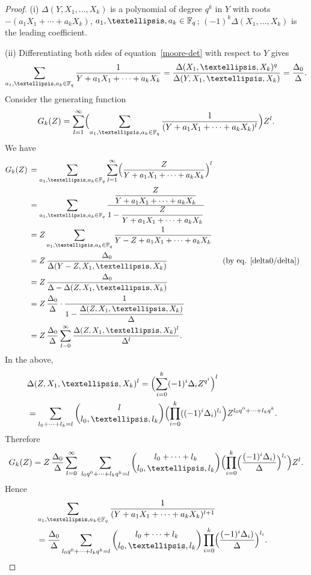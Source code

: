 \documentclass[10pt,a4paper]{amsart}
\begin{document}
\begin{proof} 
(i) $\Delta(Y,X_1,\dots,X_k)$ is a polynomial of degree $q^k$ in $Y$ with roots $-(a_1X_1+\cdots+a_kX_k)$, $a_1,\dots,a_k\in\Bbb F_q$; $(-1)^{k}\Delta(X_1,\dots,X_k)$ is the leading coefficient.

\medskip
(ii) Differentiating both sides of equation~\eqref{moore-det} with respect to $Y$ gives 
\begin{equation}\label{delta0/delta}
\sum_{a_1,\dots,a_k\in\Bbb F_q}\frac 1{Y+a_1X_1+\cdots+a_kX_k}=\frac{\Delta(X_1,\dots,X_k)^q}{\Delta(Y,X_1,\dots,X_k)}=\frac{\Delta_0}{\Delta}.
\end{equation}
Consider the generating function
\[
G_k(Z)=\sum_{l=1}^\infty\Bigl(\sum_{a_1,\dots,a_k\in\Bbb F_q}\frac 1{(Y+a_1X_1+\cdots+a_kX_k)^l}\Bigr)Z^l.
\]
We have
\begin{align*}
G_k(Z)\,&=\sum_{a_1,\dots,a_k\in\Bbb F_q}\sum_{l=1}^\infty\Bigl(\frac Z{Y+a_1X_1+\cdots+a_kX_k}\Bigr)^l\cr
&=\sum_{a_1,\dots,a_k\in\Bbb F_q}\frac{\displaystyle \frac Z{Y+a_1X_1+\cdots+a_kX_k}}{\displaystyle 1-\frac Z{Y+a_1X_1+\cdots+a_kX_k}}\cr
&=Z\sum_{a_1,\dots,a_k\in\Bbb F_q}\frac 1{Y-Z+a_1X_1+\cdots+a_kX_k}\cr
&=Z\,\frac{\Delta_0}{\Delta(Y-Z,X_1,\dots,X_k)}\kern 7em\text{(by eq. \eqref{delta0/delta})}\cr
&=Z\,\frac{\Delta_0}{\Delta-\Delta(Z,X_1,\dots,X_k)}\cr
&=Z\,\frac{\Delta_0}{\Delta}\cdot\frac 1{\displaystyle 1-\frac{\Delta(Z,X_1,\dots,X_k)}{\Delta}}\cr
&=Z\,\frac{\Delta_0}{\Delta}\sum_{l=0}^\infty\frac{\Delta(Z,X_1,\dots,X_k)^l}{\Delta^l}.
\end{align*}
In the above,
\begin{align*}
&\Delta(Z,X_1,\dots,X_k)^l=\Bigl(\sum_{i=0}^k(-1)^i\Delta_iZ^{q^i}\Bigr)^l\cr
&=\sum_{l_0+\cdots+l_k=l}\binom l{l_0,\dots,l_k}\Bigl(\prod_{i=0}^k((-1)^i\Delta_i)^{l_i}\Bigr)Z^{l_0q^0+\cdots+l_kq^k}.
\end{align*}
Therefore
\[
G_k(Z)=Z\,\frac{\Delta_0}\Delta\sum_{l=0}^\infty\;\sum_{l_0q^0+\cdots+l_kq^k=l}\binom{l_0+\cdots+l_k}{l_0,\dots,l_k}\Bigl(\prod_{i=0}^k\Bigl(\frac{(-1)^i\Delta_i)}\Delta\Bigr)^{l_i}\Bigr)Z^l.
\]
Hence
\begin{align*}
&\sum_{a_1,\dots,a_k\in\Bbb F_q}\frac 1{(Y+a_1X_1+\cdots+a_kX_k)^{l+1}}\cr
&=\frac{\Delta_0}\Delta\sum_{l_0q^0+\cdots+l_kq^k=l}\binom{l_0+\cdots+l_k}{l_0,\dots,l_k}\prod_{i=0}^k\Bigl(\frac{(-1)^i\Delta_i)}\Delta\Bigr)^{l_i}.
\end{align*}
\end{proof}
\end{document}
